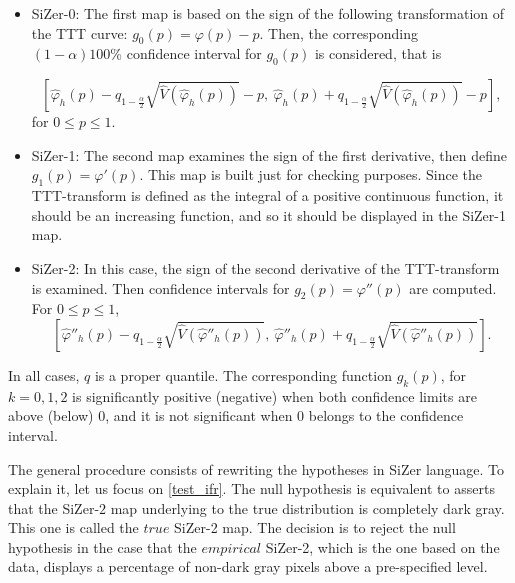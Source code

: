 \documentclass[preprint,12pt]{elsarticle}
\begin{document}
\begin{itemize}
\item SiZer-0:
\noindent The first map is based on the sign of the following transformation of the  TTT curve: $g_0(p)=\varphi(p) - p$.
Then,  the corresponding $(1-\alpha)100\%$ confidence interval for $g_0(p)$ is considered, that is 

\[
\left[\widehat{\varphi}_h(p)-q_{1-\frac{\alpha}{2}}\sqrt{\widehat{V}\left(\widehat{\varphi}_h(p)\right)}-p, \ \widehat{\varphi}_h(p)+q_{1-\frac{\alpha}{2}}\sqrt{\widehat{V}\left(\widehat{\varphi}_h(p)\right) }- p \right],
\]
\noindent for $0\leq p \leq 1$.


\item SiZer-1:
\noindent The second map examines the sign of the first derivative, then define $g_1(p)=\varphi'(p)$. This map is built just for checking purposes. Since the TTT-transform is defined as the integral of a positive continuous function, it should be an increasing function, and so it should be displayed in the SiZer-1 map. %

\item SiZer-2:
\noindent In this case,  the sign of the second derivative of the TTT-transform is examined. Then  confidence intervals for $g_2(p)=\varphi''(p)$ are computed. For $0\leq p \leq 1$,
\begin{equation}\label{ci_d2phi}
\left[\widehat{\varphi}''_h(p)-q_{1-\frac{\alpha}{2}}\sqrt{\widehat{V}\left(\widehat{\varphi}''_h(p)\right)}, \ \widehat{\varphi}''_h(p)+q_{1-\frac{\alpha}{2}}\sqrt{\widehat{V}\left(\widehat{\varphi}''_h(p)\right)}\right].
\end{equation}

\end{itemize}
In all cases, $q$ is a proper quantile. The corresponding function $g_k(p)$, for $k =0,1,2$ is significantly positive (negative) when both confidence limits are above (below) 0, and it is not significant when 0 belongs to the confidence interval.

The general procedure consists of rewriting the hypotheses in SiZer language. To explain it, let us focus on \eqref{test_ifr}. The null hypothesis is equivalent to asserts that the  SiZer-$2$ map underlying to the true distribution is completely dark gray. This one is called the $true$ SiZer-2 map. The decision is to reject the null hypothesis in the case that the $empirical$ SiZer-2, which is the one based on the data,  displays a percentage of non-dark gray pixels above a pre-specified level.
\end{document}
